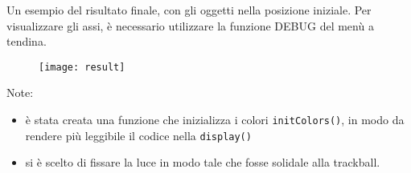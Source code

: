 Un esempio del risultato finale, con gli oggetti nella posizione iniziale. Per visualizzare gli assi, è necessario utilizzare la funzione DEBUG del menù a tendina.
 \begin{figure}[htb]
    \centering
    \texttt{[image: result]}
    \caption*{\label{fig:result}}
\end{figure}


Note: 
\begin{itemize}
  \item è stata creata una funzione che inizializza i colori \texttt{initColors()}, in modo da rendere più leggibile il codice nella \texttt{display()}
  \item si è scelto di fissare la luce in modo tale che fosse solidale alla trackball.
\end{itemize}









%
